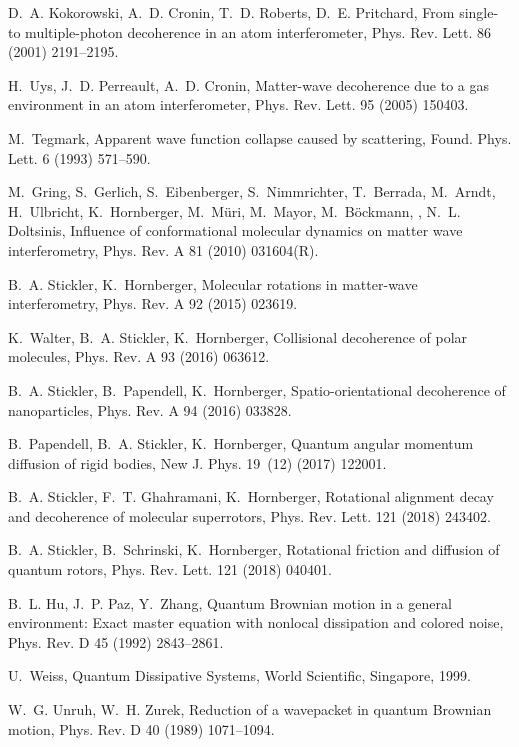 \documentclass[3p,sort&compress,12pt]{elsarticle}
\begin{document}
\begin{thebibliography}{100}
D.~A. Kokorowski, A.~D. Cronin, T.~D. Roberts, D.~E. Pritchard, From single- to
  multiple-photon decoherence in an atom interferometer, Phys. Rev. Lett. 86
  (2001) 2191--2195.

H.~Uys, J.~D. Perreault, A.~D. Cronin, Matter-wave decoherence due to a gas
  environment in an atom interferometer, Phys. Rev. Lett. 95 (2005) 150403.

M.~Tegmark, Apparent wave function collapse caused by scattering, Found. Phys.
  Lett. 6 (1993) 571--590.

M.~Gring, S.~Gerlich, S.~Eibenberger, S.~Nimmrichter, T.~Berrada, M.~Arndt,
  H.~Ulbricht, K.~Hornberger, M.~M{\"u}ri, M.~Mayor, M.~B{\"o}ckmann, , N.~L.
  Doltsinis, Influence of conformational molecular dynamics on matter wave
  interferometry, Phys. Rev. A 81 (2010) 031604(R).

B.~A. Stickler, K.~Hornberger, Molecular rotations in matter-wave
  interferometry, Phys. Rev. A 92 (2015) 023619.

K.~Walter, B.~A. Stickler, K.~Hornberger, Collisional decoherence of polar
  molecules, Phys. Rev. A 93 (2016) 063612.

B.~A. Stickler, B.~Papendell, K.~Hornberger, Spatio-orientational decoherence
  of nanoparticles, Phys. Rev. A 94 (2016) 033828.

B.~Papendell, B.~A. Stickler, K.~Hornberger, Quantum angular momentum diffusion
  of rigid bodies, New J. Phys. 19~(12) (2017) 122001.

B.~A. Stickler, F.~T. Ghahramani, K.~Hornberger, Rotational alignment decay and
  decoherence of molecular superrotors, Phys. Rev. Lett. 121 (2018) 243402.

B.~A. Stickler, B.~Schrinski, K.~Hornberger, Rotational friction and diffusion
  of quantum rotors, Phys. Rev. Lett. 121 (2018) 040401.

B.~L. Hu, J.~P. Paz, Y.~Zhang, Quantum {B}rownian motion in a general
  environment: {E}xact master equation with nonlocal dissipation and colored
  noise, Phys. Rev. D 45 (1992) 2843--2861.

U.~Weiss, Quantum Dissipative Systems, World Scientific, Singapore, 1999.

W.~G. Unruh, W.~H. Zurek, Reduction of a wavepacket in quantum {B}rownian
  motion, Phys. Rev. D 40 (1989) 1071--1094.


\end{thebibliography}
\end{document}
